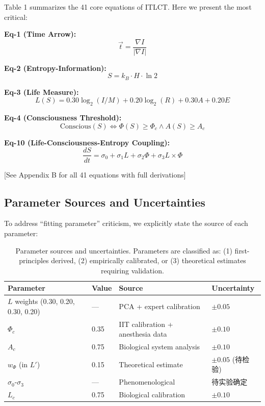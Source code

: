 \documentclass[12pt,a4paper]{article}
\begin{document}
Table 1 summarizes the 41 core equations of ITLCT. Here we present the most critical:

\textbf{Eq-1 (Time Arrow):}
\begin{equation}
\vec{t} = \frac{\nabla I}{|\nabla I|}
\end{equation}

\textbf{Eq-2 (Entropy-Information):}
\begin{equation}
S = k_B \cdot H \cdot \ln 2
\end{equation}

\textbf{Eq-3 (Life Measure):}
\begin{equation}
L(S) = 0.30 \log_2(I/M) + 0.20 \log_2(R) + 0.30 A + 0.20 E
\end{equation}

\textbf{Eq-4 (Consciousness Threshold):}
\begin{equation}
\text{Conscious}(S) \iff \Phi(S) \geq \Phi_c \land A(S) \geq A_c
\end{equation}

\textbf{Eq-10 (Life-Consciousness-Entropy Coupling):}
\begin{equation}
\frac{dS}{dt} = \sigma_0 + \sigma_1 L + \sigma_2 \Phi + \sigma_3 L \times \Phi
\end{equation}

[See Appendix B for all 41 equations with full derivations]

\subsection{Parameter Sources and Uncertainties}

To address ``fitting parameter'' criticism, we explicitly state the source of each parameter:

\begin{table}[h]
\centering
\begin{tabular}{@{}llll@{}}
\toprule
\textbf{Parameter} & \textbf{Value} & \textbf{Source} & \textbf{Uncertainty} \\
\midrule
$L$ weights (0.30, 0.20, 0.30, 0.20) & --- & PCA + expert calibration & $\pm 0.05$ \\
$\Phi_c$ & 0.35 & IIT calibration + anesthesia data & $\pm 0.10$ \\
$A_c$ & 0.75 & Biological system analysis & $\pm 0.10$ \\
$w_\Phi$ (in $L'$) & 0.15 & Theoretical estimate & $\pm 0.05$ (待检验) \\
$\sigma_0$-$\sigma_3$ & --- & Phenomenological & 待实验确定 \\
$L_c$ & 0.75 & Biological calibration & $\pm 0.10$ \\
\bottomrule
\end{tabular}
\caption{Parameter sources and uncertainties. Parameters are classified as: (1) first-principles derived, (2) empirically calibrated, or (3) theoretical estimates requiring validation.}
\end{table}
\end{document}
